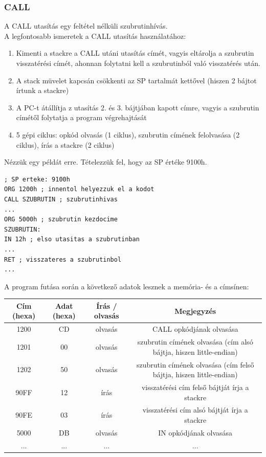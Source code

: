 \documentclass{article}
\begin{document}
\subsubsection{CALL}
A CALL utasítás egy feltétel nélküli szubrutinhívás. \\
A legfontosabb ismeretek a CALL utasítás használatához:
\begin{enumerate}
	\item Kimenti a stackre a CALL utáni utasítás címét, vagyis eltárolja a szubrutin visszatérési címét, ahonnan folytatni kell a szubrutinból való visszatérés után.
	\item A stack müvelet kapcsán csökkenti az SP tartalmát kettővel (hiszen 2 bájtot írtunk a stackre)
	\item A PC-t átállítja z utasítás 2. és 3. bájtjában kapott címre, vagyis a szubrutin címétől folytatja a program végrehajtását
	\item 5 gépi ciklus: opkód olvasás (1 ciklus), szubrutin címének felolvasása (2 ciklus), írás a stackre (2 ciklus)
\end{enumerate}
Nézzük egy példát erre. Tételezzük fel, hogy az SP értéke 9100h.
\begin{lstlisting}[frame=single]
; SP erteke: 9100h
ORG 1200h ; innentol helyezzuk el a kodot
CALL SZUBRUTIN ; szubrutinhivas
...
ORG 5000h ; szubrutin kezdocime
SZUBRUTIN:
IN 12h ; elso utasitas a szubrutinban
...
RET ; visszateres a szubrutinbol
...
\end{lstlisting}
A program futása során a következő adatok lesznek a memória- és a címsínen:
\begin{center}
\begin{tabular}{ |c|c|c|c| } 
 \hline
 Cím (hexa) & Adat (hexa) & Írás / olvasás & Megjegyzés \\ \hline
 1200 & CD & olvasás & CALL opkódjának olvasása \\ \hline
 1201 & 00 & olvasás & szubrutin címének olvasása (cím alsó bájtja, hiszen little-endian) \\ \hline
 1202 & 50 & olvasás & szubrutin címének olvasása (cím felső bájtja, hiszen little-endian) \\ \hline
 90FF & 12 & írás & visszatérési cím felső bájtját írja a stackre \\ \hline
 90FE & 03 & írás & visszatérési cím alsó bájtját írja a stackre \\ \hline
 5000 & DB & olvasás & IN opkódjának olvasása \\ \hline
 ... & ... & ... & ... \\ \hline
\end{tabular}
\end{center}
\end{document}
